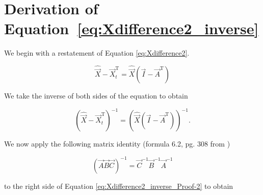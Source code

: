 %
%
%

\appendix
\chapter{Derivation of Equation~\ref{eq:Xdifference2_inverse}}
\label{app:C} %



We begin with a restatement of Equation \ref{eq:Xdifference2}.

\begin{equation} \label{eq:Xdifference2_inverse_Proof-1}
	\hat{\vec{X}} - \vec{X}_t^\mathrm{T} = \hat{\vec{X}}(\vec{I} - \vec{A}^\mathrm{T})
\end{equation}

\noindent We take the inverse of both sides of the equation to obtain

\begin{equation} \label{eq:Xdifference2_inverse_Proof-2}
	\left(\hat{\vec{X}} - \vec{X}_t^\mathrm{T}\right)^{-1} = \left(\hat{\vec{X}}(\vec{I} - \vec{A}^\mathrm{T})\right)^{-1}.
\end{equation}

\noindent We now apply the following matrix identity (formula 6.2, pg. 308 from \cite{Zwillinger2011})


\begin{equation} \label{eq:Xdifference2_inverse_Proof-3}
	\left(\vec{A}\vec{B}\vec{C}\right)^{-1} = \vec{C}^{-1} \vec{B}^{-1} \vec{A}^{-1}
\end{equation}

\noindent to the right side of Equation \ref{eq:Xdifference2_inverse_Proof-2} to obtain

